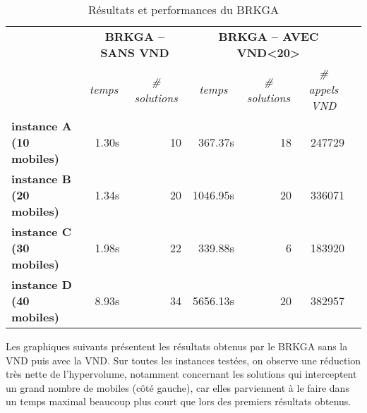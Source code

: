             \begin{table}[H]
                \centering
                \begin{tabular}{r|r|r|r|r|r|l}
                \cline{2-6}
                \multicolumn{1}{l|}{\multirow{2}{*}{}}                 & \multicolumn{2}{c|}{\textbf{BRKGA -- SANS VND}}                                  & \multicolumn{3}{c|}{\textbf{BRKGA -- AVEC VND<20>}}                                                                                &  \\ \cline{2-6}
                \multicolumn{1}{l|}{}                                  & \multicolumn{1}{c|}{\textit{temps}} & \multicolumn{1}{c|}{\textit{\# solutions}} & \multicolumn{1}{c|}{\textit{temps}} & \multicolumn{1}{c|}{\textit{\# solutions}} & \multicolumn{1}{c|}{\textit{\# appels VND}} &  \\ \cline{1-6}
                \multicolumn{1}{|l|}{\textbf{instance A (10 mobiles)}} & 1.30s                               & 10                                         & 367.37s                             & 18                                         & 247729                                      &  \\ \cline{1-6}
                \multicolumn{1}{|l|}{\textbf{instance B (20 mobiles)}} & 1.34s                               & 20                                         & 1046.95s                            & 20                                         & 336071                                      &  \\ \cline{1-6}
                \multicolumn{1}{|l|}{\textbf{instance C (30 mobiles)}} & 1.98s                               & 22                                         & 339.88s                             & 6                                          & 183920                                      &  \\ \cline{1-6}
                \multicolumn{1}{|l|}{\textbf{instance D (40 mobiles)}} & 8.93s                               & 34                                         & 5656.13s                            & 20                                         & 382957                                      &  \\ \cline{1-6}
                \end{tabular}
                \caption{Résultats et performances du BRKGA}
                \label{tab:brkga}
            \end{table}
            
            Les graphiques suivants présentent les résultats obtenus par le BRKGA sans la VND puis avec la VND. Sur toutes les instances testées, on observe une réduction très nette de l'hypervolume, notamment concernant les solutions qui interceptent un grand nombre de mobiles (côté gauche), car elles parviennent à le faire dans un temps maximal beaucoup plus court que lors des premiers résultats obtenus.
            
